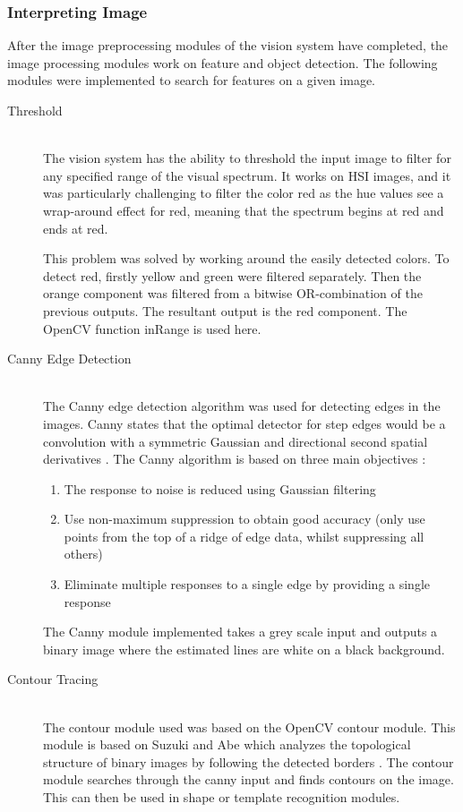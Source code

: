 \subsubsection{Interpreting Image} 
After the image preprocessing modules of the vision system have completed, the image processing modules work on feature and object detection. The following modules were implemented to search for features on a given image. 
\begin{description}
\item[Threshold]\hfill \\
The vision system has the ability to threshold the input image to filter for any specified range of the visual spectrum. 
It works on HSI images, and it was particularly challenging to filter the color red as the hue values see a wrap-around effect for red, meaning that the spectrum begins at red and ends at red.

This problem was solved by working around the easily detected colors. To detect red, firstly yellow and green were filtered separately. Then the orange component was filtered from a bitwise OR-combination of the previous outputs. The resultant output is the red component.
The OpenCV function inRange is used here.

\item[Canny Edge Detection]\hfill \\
The Canny edge detection algorithm \cite{Canny:1986:CAE:11274.11275}  was used for detecting edges in the images. Canny states that the optimal detector for step edges would be a convolution with a symmetric Gaussian and directional second spatial derivatives \cite{books/sp/Cipolla96}. The Canny algorithm is based on three main objectives \cite{Nixon:2008:FEI:1571711}:
\begin{enumerate}
  \item The response to noise is reduced using Gaussian filtering
  \item Use non-maximum suppression to obtain good accuracy (only use points from the top of a ridge of edge data, whilst suppressing all others)
  \item Eliminate multiple responses to a single edge by providing a single response
\end{enumerate}

The Canny module implemented takes a grey scale input and outputs a binary image where the estimated lines are white on a black background.

\item[Contour Tracing]\hfill \\
The contour module used was based on the OpenCV contour module. This module is based on Suzuki and Abe which analyzes the topological structure of binary
images by following the detected borders \cite{article:suzuki}. 
The contour module searches through the canny input and finds contours on the image. This can then be used in shape or template recognition modules.


\end{description}
